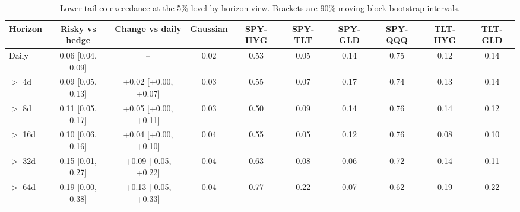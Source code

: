 \begin{table}[H]
\centering
\footnotesize
\setlength{\tabcolsep}{3pt}
\begin{tabular}{|l|c|c|c|c|c|c|c|c|c|}
\hline
\textbf{Horizon} & \textbf{Risky vs hedge} & \textbf{Change vs daily} & \textbf{Gaussian} & \textbf{SPY-HYG} & \textbf{SPY-TLT} & \textbf{SPY-GLD} & \textbf{SPY-QQQ} & \textbf{TLT-HYG} & \textbf{TLT-GLD} \\
\hline
Daily & 0.06 [0.04, 0.09] & -- & 0.02 & 0.53 & 0.05 & 0.14 & 0.75 & 0.12 & 0.14 \\
$>$ 4d & 0.09 [0.05, 0.13] & +0.02 [+0.00, +0.07] & 0.03 & 0.55 & 0.07 & 0.17 & 0.74 & 0.13 & 0.14 \\
$>$ 8d & 0.11 [0.05, 0.17] & +0.05 [+0.00, +0.11] & 0.03 & 0.50 & 0.09 & 0.14 & 0.76 & 0.14 & 0.12 \\
$>$ 16d & 0.10 [0.06, 0.16] & +0.04 [+0.00, +0.10] & 0.04 & 0.55 & 0.05 & 0.12 & 0.76 & 0.08 & 0.10 \\
$>$ 32d & 0.15 [0.01, 0.27] & +0.09 [-0.05, +0.22] & 0.04 & 0.63 & 0.08 & 0.06 & 0.72 & 0.14 & 0.11 \\
$>$ 64d & 0.19 [0.00, 0.38] & +0.13 [-0.05, +0.33] & 0.04 & 0.77 & 0.22 & 0.07 & 0.62 & 0.19 & 0.22 \\
\hline
\end{tabular}
\caption{Lower-tail co-exceedance at the 5\% level by horizon view. Brackets are 90\% moving block bootstrap intervals.}
\label{tab:tail_by_horizon}
\end{table}
